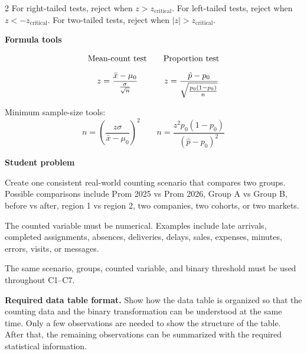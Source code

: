 \documentclass[12pt]{article}
\newcommand{\SubsectionBox}[1]{%
	\noindent\colorbox{gray!30}{%
		\parbox{\linewidth}{\textbf{#1}}%
	}\par\vspace{0.35cm}%
}
\begin{document}
\begin{multicols}{2}
		For right-tailed tests, reject when \(z>z_{\text{critical}}\). For left-tailed tests, reject when \(z<-z_{\text{critical}}\). For two-tailed tests, reject when \(|z|>z_{\text{critical}}\).
		
		\vspace{0.25cm}
		
		\SubsectionBox{Formula tools}
		\vspace{-0.65cm}
		\[
		\begin{array}{c@{\qquad}c}
			\text{Mean-count test} & \text{Proportion test} \\[0.35cm]
			z=\dfrac{\bar x-\mu_0}{\frac{\sigma}{\sqrt{n}}}
			&
			z=\dfrac{\hat p-p_0}{\sqrt{\frac{p_0(1-p_0)}{n}}}
		\end{array}
		\]
		
		Minimum sample-size tools:
		\[
		n=\left(\frac{z\sigma}{\bar x-\mu_0}\right)^2
		\qquad 
		n=\frac{z^2p_0(1-p_0)}{(\hat p-p_0)^2}
		\]
		
		\vspace{0.25cm}
		
		\SubsectionBox{Student problem}
		\vspace{-0.25cm}
		
		Create one consistent real-world counting scenario that compares two groups. Possible comparisons include Prom 2025 vs Prom 2026, Group A vs Group B, before vs after, region 1 vs region 2, two companies, two cohorts, or two markets.
		
		The counted variable must be numerical. Examples include late arrivals, completed assignments, absences, deliveries, delays, sales, expenses, minutes, errors, visits, or messages.
		
		The same scenario, groups, counted variable, and binary threshold must be used throughout C1--C7.
		
		\vspace{0.15cm}
		
		\textbf{Required data table format.} Show how the data table is organized so that the counting data and the binary transformation can be understood at the same time. Only a few observations are needed to show the structure of the table. After that, the remaining observations can be summarized with the required statistical information.
		

\end{multicols}
\end{document}
